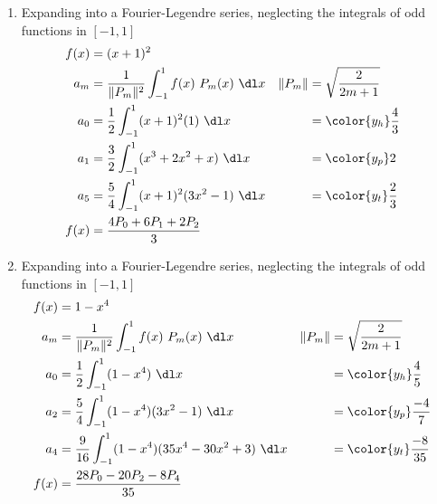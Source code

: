 \begin{enumerate}
    \item Expanding into a Fourier-Legendre series, neglecting the integrals of odd
          functions in $ [-1, 1] $
          \begin{align}
              f(x)                              & = (x+1)^2                       \\
              a_m                               & = \frac{1}{\lVert P_m \rVert^2}
              \int_{-1}^{1} f(x)\ P_m(x)\ \dl x &
              \lVert P_m \rVert                 & = \sqrt{\frac{2}{2m + 1}}       \\
              a_0                               & = \frac{1}{2} \int_{-1}^{1}
              (x+1)^2 (1)\ \dl x                &
                                                & = \color{y_h} \frac{4}{3}       \\
              a_1                               & = \frac{3}{2} \int_{-1}^{1}
              (x^3 + 2x^2 + x)\ \dl x           &
                                                & =  \color{y_p} 2                \\
              a_5                               & = \frac{5}{4} \int_{-1}^{1}
              (x+1)^2 (3x^2 - 1)\ \dl x         &
                                                & =  \color{y_t} \frac{2}{3}      \\
              f(x)                              & = \frac{4P_0 + 6P_1 + 2P_2}{3}
          \end{align}

    \item Expanding into a Fourier-Legendre series, neglecting the integrals of odd
          functions in $ [-1, 1] $
          \begin{align}
              f(x)                               & = 1 - x^4                         \\
              a_m                                & = \frac{1}{\lVert P_m \rVert^2}
              \int_{-1}^{1} f(x)\ P_m(x)\ \dl x  &
              \lVert P_m \rVert                  & = \sqrt{\frac{2}{2m + 1}}         \\
              a_0                                & = \frac{1}{2} \int_{-1}^{1}
              (1 - x^4)\ \dl x                   &
                                                 & = \color{y_h} \frac{4}{5}         \\
              a_2                                & = \frac{5}{4} \int_{-1}^{1}
              (1-x^4)(3x^2 - 1)\ \dl x           &
                                                 & =  \color{y_p} \frac{-4}{7}       \\
              a_4                                & = \frac{9}{16} \int_{-1}^{1}
              (1-x^4) (35x^4 - 30x^2 + 3)\ \dl x &
                                                 & =  \color{y_t} \frac{-8}{35}      \\
              f(x)                               & = \frac{28P_0 - 20P_2 - 8P_4}{35}
          \end{align}


\end{enumerate}
